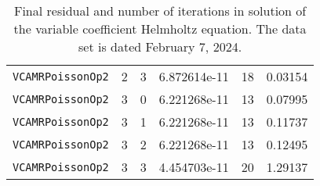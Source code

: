 \documentclass{article}
\begin{document}
\begin{small}
\begin{table}
\begin{center}
\begin{tabular}{|c|c|c|c|c||c|}
 {\tt VCAMRPoissonOp2}            & 2   & 3    & 6.872614e-11   & 18   & 0.03154\\
 {\tt VCAMRPoissonOp2}            & 3   & 0    & 6.221268e-11   & 13   & 0.07995\\
 {\tt VCAMRPoissonOp2}            & 3   & 1    & 6.221268e-11   & 13   & 0.11737\\
 {\tt VCAMRPoissonOp2}            & 3   & 2    & 6.221268e-11   & 13   & 0.12495\\
 {\tt VCAMRPoissonOp2}            & 3   & 3    & 4.454703e-11   & 20   & 1.29137\\
\hline
\end{tabular}
\end{center}
\label{tab::conductivity2}
\caption
    {
      Final residual and number of iterations in solution of the variable
      coefficient Helmholtz equation.
      The data set is dated February 7, 2024.
    }
\end{table}
\end{small}
\end{document}
